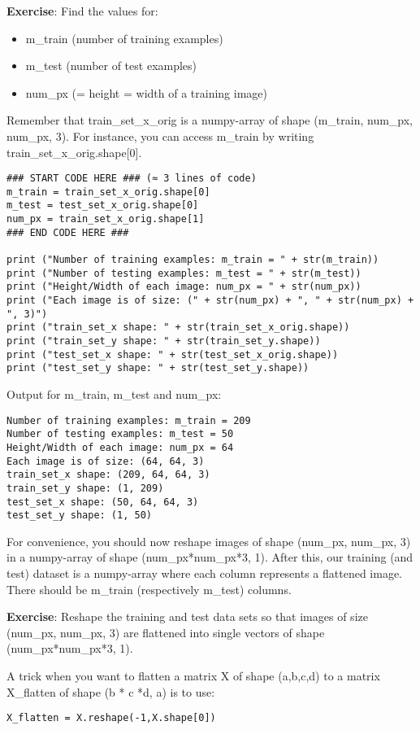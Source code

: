{\textbf {Exercise}: Find the values for:
\begin{itemize}
\item m\_train (number of training examples)
\item m\_test (number of test examples)
\item num\_px (= height = width of a training image)
\end{itemize}

Remember that train\_set\_x\_orig is a numpy-array of shape (m\_train, num\_px, num\_px, 3). For instance, you can access m\_train by writing train\_set\_x\_orig.shape[0].

\begin{verbatim}
### START CODE HERE ### (≈ 3 lines of code)
m_train = train_set_x_orig.shape[0]
m_test = test_set_x_orig.shape[0]
num_px = train_set_x_orig.shape[1]
### END CODE HERE ###

print ("Number of training examples: m_train = " + str(m_train))
print ("Number of testing examples: m_test = " + str(m_test))
print ("Height/Width of each image: num_px = " + str(num_px))
print ("Each image is of size: (" + str(num_px) + ", " + str(num_px) + ", 3)")
print ("train_set_x shape: " + str(train_set_x_orig.shape))
print ("train_set_y shape: " + str(train_set_y.shape))
print ("test_set_x shape: " + str(test_set_x_orig.shape))
print ("test_set_y shape: " + str(test_set_y.shape))
\end{verbatim}

Output for m\_train, m\_test and num\_px:
\begin{verbatim}
Number of training examples: m_train = 209
Number of testing examples: m_test = 50
Height/Width of each image: num_px = 64
Each image is of size: (64, 64, 3)
train_set_x shape: (209, 64, 64, 3)
train_set_y shape: (1, 209)
test_set_x shape: (50, 64, 64, 3)
test_set_y shape: (1, 50)
\end{verbatim}


For convenience, you should now reshape images of shape (num\_px, num\_px, 3) in a numpy-array of shape (num\_px*num\_px*3, 1). After this, our training (and test) dataset is a numpy-array where each column represents a flattened image. There should be m\_train (respectively m\_test) columns.

{\textbf {Exercise}: Reshape the training and test data sets so that images of size (num\_px, num\_px, 3) are flattened into single vectors of shape  (num\_px*num\_px*3, 1).


A trick when you want to flatten a matrix X of shape (a,b,c,d) to a matrix X\_flatten of shape (b * c *d, a) is to use:
\begin{verbatim}
X_flatten = X.reshape(-1,X.shape[0]) 
\end{verbatim}

}}
